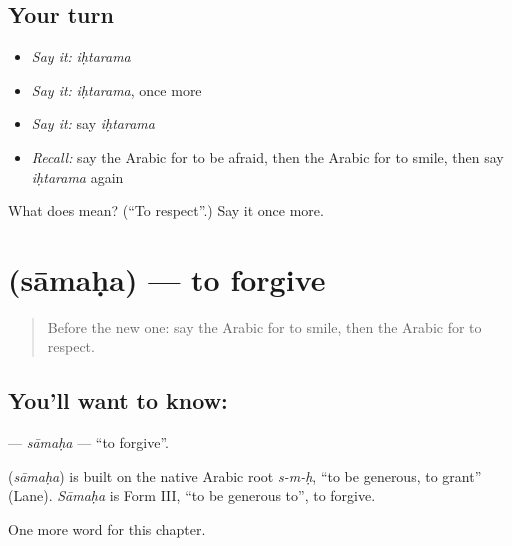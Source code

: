 \subsection*{Your turn}
\begin{itemize}
\raggedright
  \item \emph{Say it:} \emph{iḥtarama}
  \item \emph{Say it:} \emph{iḥtarama}, once more
  \item \emph{Say it:} say \emph{iḥtarama}
  \item \emph{Recall:} say the Arabic for to be afraid, then the Arabic for to smile, then say \emph{iḥtarama} again
\end{itemize}

\begin{tcolorbox}[breakable,colback=teal!4,colframe=teal!35!black,title={Before you move on}]
What does  mean? (\textquotedblleft{}To respect\textquotedblright{}.) Say it once more.
\end{tcolorbox}
\section[\texorpdfstring{\ar{سامح} (sāmaḥa)}{سامح (sāmaḥa)}]{ (sāmaḥa) — to forgive}

\label{lesson:AR-C258-samaha2}



\begin{quote}
Before the new one: say the Arabic for to smile, then the Arabic for to respect.
\end{quote}

\subsection*{You'll want to know: }
\textbf{} — \emph{sāmaḥa} — \textquotedblleft{}to forgive\textquotedblright{}.

\begin{cousinweb}
\textbf{} (\emph{sāmaḥa}) is built on the native Arabic root \emph{s-m-ḥ}, \textquotedblleft{}to be generous, to grant\textquotedblright{} (Lane). \emph{Sāmaḥa} is Form III, \textquotedblleft{}to be generous to\textquotedblright{}, to forgive.
\end{cousinweb}

\begin{grammarlens}[title={What you've built}]
One more word for this chapter.
\end{grammarlens}

